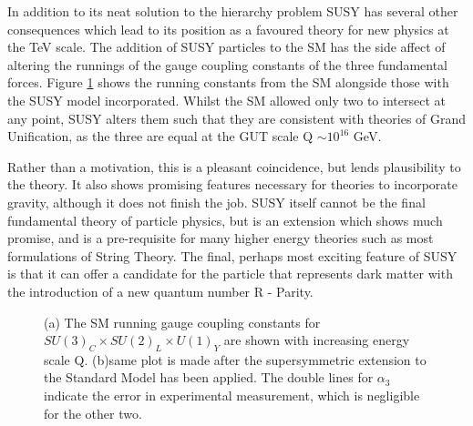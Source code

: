 In addition to its neat solution to the hierarchy problem SUSY has several other consequences which lead to its position as a favoured theory for new physics at the TeV scale. The addition of SUSY particles to the SM has the side affect of altering the runnings of the gauge coupling constants of the three fundamental forces. Figure \ref{fig:couple} shows the running constants from the SM alongside those with the SUSY model incorporated. Whilst the SM allowed only two to intersect at any point, SUSY alters them such that they are consistent with theories of Grand Unification, as the three are equal at the GUT scale Q $\sim 10^{16}$ GeV. 

Rather than a motivation, this is a pleasant coincidence, but lends plausibility to the theory. It also shows promising features necessary for theories to incorporate gravity, although it does not finish the job. SUSY itself cannot be the final fundamental theory of particle physics, but is an extension which shows much promise, and is a pre-requisite for many higher energy theories such as most formulations of String Theory\cite{Dine}. The final, perhaps most exciting feature of SUSY is that it can offer a candidate for the particle that represents dark matter with the introduction of a new quantum number R - Parity. 

\begin{figure}
\centering
{}
\caption[The running gauge coupling constants for $SU(3)_{C} \times SU(2)_{L} \times U(1)_{Y}$ in the SM and SUSY cases.]{\label{fig:couple}(a) The SM running gauge coupling constants for $SU(3)_{C} \times SU(2)_{L} \times U(1)_{Y}$ are shown with increasing energy scale Q. (b)same plot is made after the supersymmetric extension to the Standard Model has been applied. The double lines for $\alpha_{3}$ indicate the error in experimental  measurement, which is negligible for the other two.~\cite{PeskinBSM}}
\end{figure}



